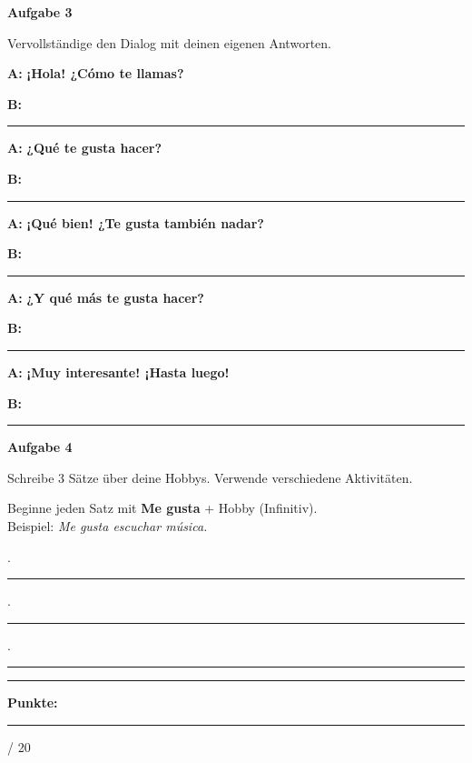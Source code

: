 \documentclass[11pt, a4paper]{article}
\newcommand{\fachfarbe}{spanisch}
\newcommand{\maxpunkte}{20}
\newcommand{\punktebox}[1]{\hfill\fbox{\small \_/#1}}
\newcommand{\luecke}[1]{\rule{#1}{0.4pt}}
\newenvironment{aufgabe}[1]{%
    \needspace{5\baselineskip}%
    \nopagebreak[4]%
    \vspace{10pt}
    \noindent\textbf{\textcolor{\fachfarbe}{Aufgabe #1}}
    \nopagebreak[4]%
    \vspace{5pt}
    \nopagebreak[4]%
    \begin{list}{}{\leftmargin=0pt}
    \item[]
}{%
    \end{list}
}
\newcommand{\es}[1]{\textcolor{\fachfarbe}{\textbf{#1}}}
\begin{document}
\vspace{15pt}


\begin{aufgabe}{3}
Vervollständige den Dialog mit deinen eigenen Antworten. \punktebox{5}
\end{aufgabe}

\noindent
\textbf{A:} \es{¡Hola! ¿Cómo te llamas?}

\textbf{B:} \luecke{8cm}

\textbf{A:} \es{¿Qué te gusta hacer?}

\textbf{B:} \luecke{8cm}

\textbf{A:} \es{¡Qué bien! ¿Te gusta también nadar?}

\textbf{B:} \luecke{8cm}

\textbf{A:} \es{¿Y qué más te gusta hacer?}

\textbf{B:} \luecke{8cm}

\textbf{A:} \es{¡Muy interesante! ¡Hasta luego!}

\textbf{B:} \luecke{8cm}

\vspace{15pt}


\begin{aufgabe}{4}
Schreibe 3 Sätze über deine Hobbys. Verwende verschiedene Aktivitäten. \punktebox{6}
\end{aufgabe}

\begin{hinweis}
Beginne jeden Satz mit \es{Me gusta} + Hobby (Infinitiv).\\
Beispiel: \textit{Me gusta escuchar música.}
\end{hinweis}

\vspace{0.5em}

. \luecke{12cm}

\vspace{1em}

. \luecke{12cm}

\vspace{1em}

. \luecke{12cm}


\vspace{20pt}
\hrule
\vspace{10pt}

\begin{flushright}
\textbf{Punkte:} \luecke{1cm} / \maxpunkte
\end{flushright}
\end{document}

